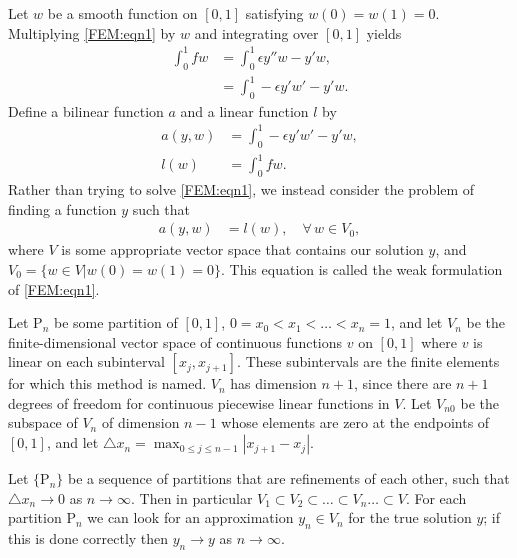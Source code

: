 Let $w$ be a smooth function on $[0,1]$ satisfying
$w(0) = w(1) = 0$. Multiplying \eqref{FEM:eqn1} by $w$ and integrating over $[0,1]$ yields
\begin{align*}
	\int_0^1 f w &= \int_0^1 \epsilon y''w - y'w, \\
	&= \int_0^1 -\epsilon y'w' - y'w.
\end{align*}
Define a bilinear function $a$ and a linear function $l$ by 
\begin{align*}
a(y,w) &= \int_0^1 -\epsilon y'w' - y'w,\\ 
l(w) &= \int_0^1 f w.
\end{align*}
Rather than trying to solve \eqref{FEM:eqn1}, we instead consider the problem of finding a function $y$ such that 
\begin{align}
	a(y,w) &= l(w), \quad \forall \, w \in V_0,
	\label{FEM:integral_form}
\end{align}
where $V$ is some appropriate vector space that contains our solution $y$, and $V_0 = \{w \in V|w(0) = w(1) = 0\}$. This equation 
is called the weak formulation of \eqref{FEM:eqn1}.




Let $\mathrm{P}_n$ be some partition of $[0,1]$, $0 = x_0 < x_1< \ldots < x_{n} = 1$, and let $V_n$ be the finite-dimensional vector space of continuous functions $v$ on $[0,1]$ where $v$ is linear on each subinterval $[{x_j,x_{j+1}}]$. These subintervals are the finite elements for which this method is named.  $V_n$ has dimension $n+1$, since there are $n+1$ degrees of freedom for continuous piecewise linear functions in $V$. Let $V_{n0}$ be the subspace of $V_n$ of dimension $n-1$ whose elements are zero at the endpoints of $[0,1]$, and let $\triangle x_n = \max_{0 \leq j \leq n-1}|x_{j+1} - x_j|$. 

Let $\{\mathrm{P}_n\}$ be a sequence of partitions that are refinements of each other, such that $\triangle x_n \to 0$ as $n \to \infty$. Then in particular $V_1 \subset V_2 \subset \ldots \subset V_n \ldots \subset V$.  For each partition $\mathrm{P}_n$ we can look for an approximation $y_n \in V_n$ for the true solution $y$; if this is done  correctly then $y_n \to y$ as $n \to \infty$. 

